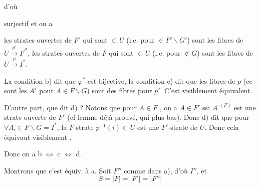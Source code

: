 \documentclass[11pt,a4paper]{article}
\begin{document}
d'où


 surjectif
et on a


les  strates ouvertes de $F'$ qui sont  $\subset U$ (i.e. pour $\in F' \smallsetminus G'$) sont les fibres de $U \xrightarrow{p'} I'^{*}$, les strates ouvertes de $F$ qui sont $\subset U$ (i.e. pour $\notin G$) sont les fibres de $U \xrightarrow{p} I^{*}$.

La condition b) dit que $\varphi^{*}$ est bijective, la condition c) dit que les fibres de $p$ (ce sont les $A^{\circ}$ pour $A \in F \smallsetminus G$) sont des fibres pour $p'$. C'est visiblement équivalent. 


D'autre part, que dit d) ? Notons que  pour $A \in F$ \struck{\ill{}}, on a $A \in F'$ ssi $A^{\circ(F)}$ est une strate ouverte de $F'$ (cf lemme déjà prouvé, qui  plus bas). Donc d) dit que pour $\forall A_{i} \in F \smallsetminus G = I^{*}$, la $F$-strate $p^{-1}(i) \subset U$ est une $F'$-strate de $U$. Donc cela équivaut visiblement \ill{}.

Donc on a b $\Longleftrightarrow$ c $\Longleftrightarrow$ d.

Montrons que c'est équiv. à a. Soit $F''$ comme dans a), d'où $I''$, et  
\[
  S = |F| = |F'| = |F''|
\]

\end{document}
